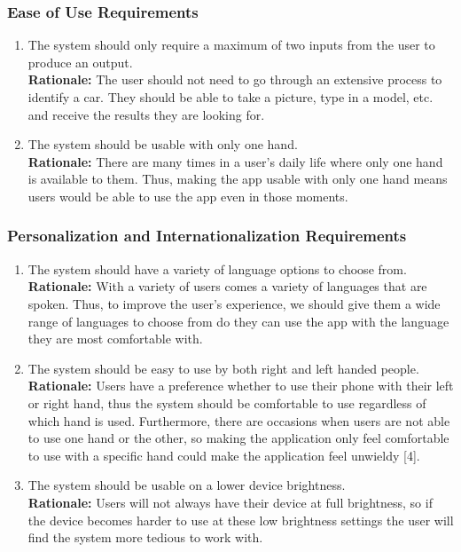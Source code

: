 \documentclass[]{article}
\begin{document}
\subsubsection{Ease of Use Requirements}
\label{ssub:ease_of_use_requirements}
\begin{enumerate}[label={UH-EOU\arabic*.}]
	\item The system should only require a maximum of two inputs from the user to produce an output.\\
	\textbf{Rationale:} The user should not need to go through an extensive process to identify a car. They should be able to take a picture, type in a model, etc. and receive the results they are looking for.
	\item The system should be usable with only one hand.\\
	\textbf{Rationale:} There are many times in a user's daily life where only one hand is available to them. Thus, making the app usable with only one hand means users would be able to use the app even in those moments.
\end{enumerate}

\subsubsection{Personalization and Internationalization Requirements}
\label{ssub:personalization_and_internationalization_requirements}
\begin{enumerate}[label={UH-PI\arabic*.}]
	\item The system should have a variety of language options to choose from.\\
	\textbf{Rationale:} With a variety of users comes a variety of languages that are spoken. Thus, to improve the user's experience, we should give them a wide range of languages to choose from do they can use the app with the language they are most comfortable with.
	\item The system should be easy to use by both right and left handed people.\\
	\textbf{Rationale:} Users have a preference whether to use their phone with their left or right hand, thus the system should be comfortable to use regardless of which hand is used. Furthermore, there are occasions when users are not able to use one hand or the other, so making the application only feel comfortable to use with a specific hand could make the application feel unwieldy [4].
	\item The system should be usable on a lower device brightness.\\
	\textbf{Rationale:} Users will not always have their device at full brightness, so if the device becomes harder to use at these low brightness settings the user will find the system more tedious to work with.
\end{enumerate}
\end{document}
